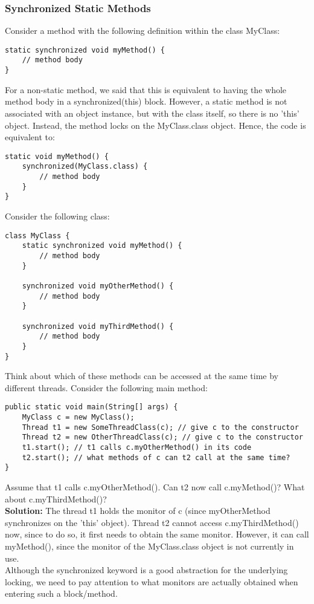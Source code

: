 \documentclass[main.tex]{subfiles}
\begin{document}
\subsubsection{Synchronized Static Methods}
Consider a method with the following definition within the class MyClass:
\begin{verbatim}
static synchronized void myMethod() {
    // method body
}
\end{verbatim}
For a non-static method, we said that this is equivalent to having the whole method body in a synchronized(this) block. However, a static method is not associated with an object instance, but with the class itself, so there is no 'this' object. Instead, the method locks on the MyClass.class object. Hence, the code is equivalent to:
\begin{verbatim}
static void myMethod() {
    synchronized(MyClass.class) {
        // method body
    }
}
\end{verbatim}
Consider the following class:
\begin{verbatim}
class MyClass {
    static synchronized void myMethod() {
        // method body
    }

    synchronized void myOtherMethod() {
        // method body
    }

    synchronized void myThirdMethod() {
        // method body
    }
}
\end{verbatim}
Think about which of these methods can be accessed at the same time by different threads. Consider the following main method:
\begin{verbatim}
public static void main(String[] args) {
    MyClass c = new MyClass();
    Thread t1 = new SomeThreadClass(c); // give c to the constructor
    Thread t2 = new OtherThreadClass(c); // give c to the constructor
    t1.start(); // t1 calls c.myOtherMethod() in its code
    t2.start(); // what methods of c can t2 call at the same time?
}
\end{verbatim}
Assume that t1 calls c.myOtherMethod(). Can t2 now call c.myMethod()? What about c.myThirdMethod()?\\[3mm]
\textbf{Solution:} The thread t1 holds the monitor of c (since myOtherMethod synchronizes on the 'this' object). Thread t2 cannot access c.myThirdMethod() now, since to do so, it first needs to obtain the same monitor. However, it can call myMethod(), since the monitor of the MyClass.class object is not currently in use.\\[3mm]
Although the synchronized keyword is a good abstraction for the underlying locking, we need to pay attention to what monitors are actually obtained when entering such a block/method.
\end{document}
